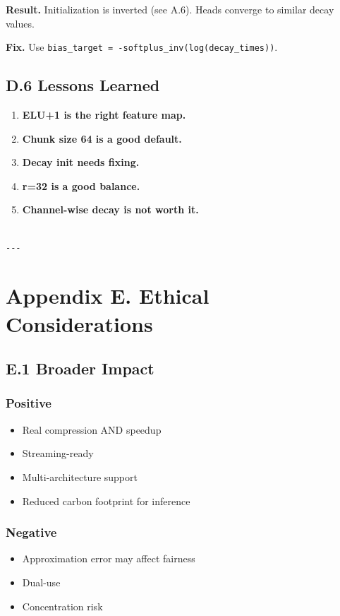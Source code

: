 \textbf{Result.} Initialization is inverted (see A.6). Heads converge to 
similar decay values.

\textbf{Fix.} Use \texttt{bias\_target = -softplus\_inv(log(decay\_times))}.

\subsection{D.6 Lessons Learned}

\begin{enumerate}
\item \textbf{ELU+1 is the right feature map.}
\item \textbf{Chunk size 64 is a good default.}
\item \textbf{Decay init needs fixing.}
\item \textbf{r=32 is a good balance.}
\item \textbf{Channel-wise decay is not worth it.}
\end{enumerate}
\begin{lstlisting}

---
\end{lstlisting}


\section{Appendix E. Ethical Considerations}

\subsection{E.1 Broader Impact}

\subsubsection{Positive}
\begin{itemize}
\item Real compression AND speedup
\item Streaming-ready
\item Multi-architecture support
\item Reduced carbon footprint for inference

\end{itemize}
\subsubsection{Negative}
\begin{itemize}
\item Approximation error may affect fairness
\item Dual-use
\item Concentration risk

\end{itemize}
